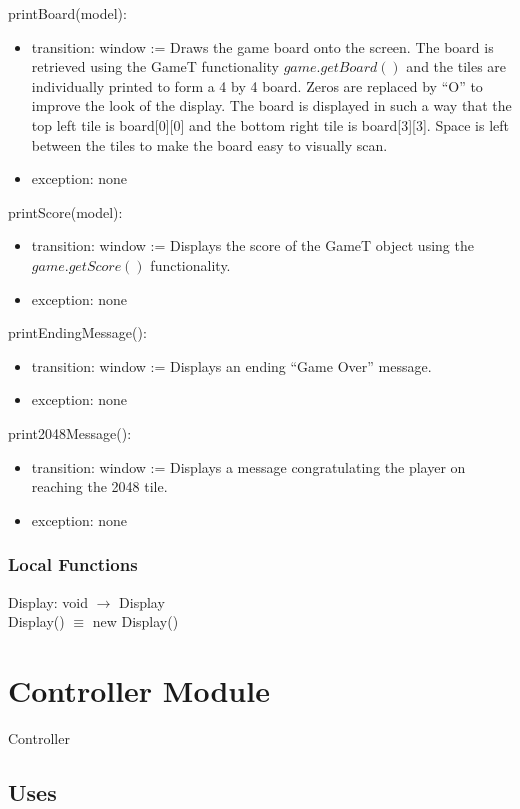 \documentclass[12pt]{article}
\begin{document}
\noindent printBoard(model):
\begin{itemize}
\item transition: window := Draws the game board onto the screen. The board is retrieved using the GameT functionality $game.getBoard()$ and the tiles are individually printed to form a 4 by 4 board. Zeros are replaced by ``O'' to improve the look of the display. The board is displayed in such a way that the top left tile is board[0][0] and the bottom right tile is board[3][3]. Space is left between the tiles to make the board easy to visually scan.
\item exception: none
\end{itemize}

\noindent printScore(model):
\begin{itemize}
\item transition: window := Displays the score of the GameT object using the $game.getScore()$ functionality.
\item exception: none
\end{itemize}
\newpage
\noindent printEndingMessage():
\begin{itemize}
\item transition: window := Displays an ending ``Game Over'' message.
\item exception: none
\end{itemize}

\noindent print2048Message():
\begin{itemize}
\item transition: window := Displays a message congratulating the player on reaching the 2048 tile.
\item exception: none
\end{itemize}

\subsubsection* {Local Functions}
\noindent Display: void $\rightarrow$ Display\\
Display() $\equiv$ new Display()

\newpage

\section* {Controller Module}

Controller

\subsection* {Uses}
\end{document}
